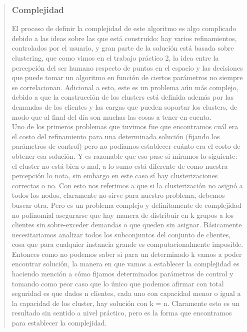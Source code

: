 \documentclass[11pt,a4paper]{article}
\begin{document}
\begin{verse}
\subsubsection{Complejidad}
El proceso de definir la complejidad de este algoritmo es algo complicado debido a las ideas sobre las que está construído: hay varios refinamientos, controlados por el usuario, y gran parte de la solución está basada sobre clustering, que como vimos en el trabajo práctico 2, la idea entre la percepción del ser humano respecto de puntos en el espacio y las decisiones que puede tomar un algoritmo en función de ciertos parámetros no siempre se correlacionan. Adicional a esto, este es un problema aún más complejo, debido a que la construcción de los clusters está definida además por las demandas de los clientes y las cargas que pueden soportar los clusters, de modo que al final del día son muchas las cosas a tener en cuenta.\\
Uno de los primeros problemas que tuvimos fue que encontramos cuál era el costo del refinamiento para una determinada solución (fijando los parámetros de control) pero no podíamos establecer cuánto era el costo de obtener esa solución. Y es razonable que eso pase si miramos lo siguiente: el cluster no está bien o mal, a lo sumo está diferente de como nuestra percepción lo nota, sin embargo en este caso sí hay clusterizaciones correctas o no. Con esto nos referimos a que si la clusterización no asignó a todos los nodos, claramente no sirve para nuestro problema, debemos buscar otra. Pero es un problema complejo y definitamente de complejidad no polinomial asegurarse que hay manera de distribuir en k grupos a los clientes sin sobre-exceder demandas o que queden sin asignar. Básicamente necesitariamos analizar todos los subconjuntos del conjunto de clientes, cosa que para cualquier instancia grande es computacionalmente imposible. Entonces como no podemos saber si para un determinado k vamos a poder encontrar solución, la manera en que vamos a establecer la complejidad es haciendo mención a cómo fijamos determinados parámetros de control y tomando como peor caso que lo único que podemos afirmar con total seguridad es que dados n clientes, cada uno con capacidad menor o igual a la capacidad de los cluster, hay solución con k = n. Claramente esto es un resultado sin sentido a nivel práctico, pero es la forma que encontramos para establecer la complejidad.\\ 


\end{verse}
\end{document}
